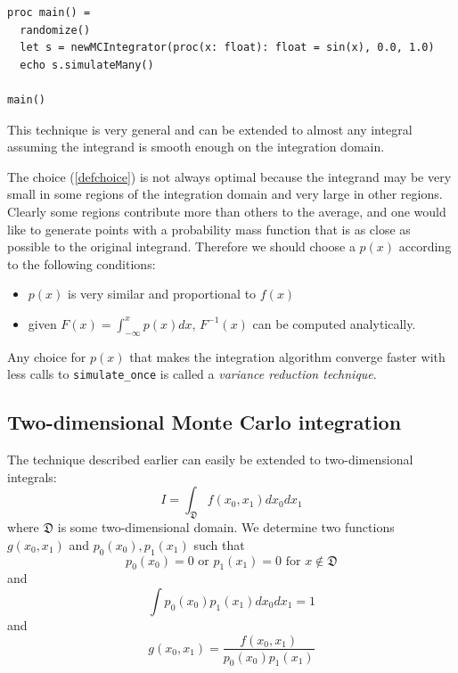 \documentclass[justified, sixbynine]{tufte-book}
\def\ft{\small\tt}
\theoremstyle{plain}%
\newtheorem * {corollary}{Corollary}
\theoremstyle{definition}
\theoremstyle{remark}
\newtheorem * {remark}{Remark}
\newtheorem * {note}{Note}
\begin{document}
\begin{fullwidth}
\begin{lstlisting}[caption={in file: {\ft integrate.nim}}]
proc main() =
  randomize()
  let s = newMCIntegrator(proc(x: float): float = sin(x), 0.0, 1.0)
  echo s.simulateMany()

main()
\end{lstlisting}

This technique is very general and can be extended to almost any integral
assuming the integrand is smooth enough on the integration domain.

The choice (\ref{defchoice}) is not always optimal because the integrand may
be very small in some regions of the integration domain and very large in
other regions. Clearly some regions contribute more than others to the
average, and one would like to generate points with a probability mass
function that is as close as possible to the original integrand. Therefore
we should choose a $p(x)$ according to the following conditions:

\begin{itemize}
\item  $p(x)$ is very similar and proportional to $f(x)$

\item  given $F(x)=\int_{-\infty }^xp(x)dx$, $F^{-1}(x)$ can be computed
analytically.
\end{itemize}

Any choice for $p(x)$ that makes the integration algorithm converge faster with less calls to {\ft simulate\_once} is called a {\it variance reduction technique}.

\goodbreak\subsection{Two-dimensional Monte Carlo integration}

The technique described earlier can easily be extended to two-dimensional integrals:
\begin{equation}
I=\int_{{\mathfrak D}}f(x_0, x_1)dx_0dx_1
\end{equation}
where ${\mathfrak D}$ is some two-dimensional domain. We determine two functions
$g(x_0, x_1)$ and $p_0(x_0), p_1(x_1)$ such that
\begin{equation}
p_0(x_0)=0\text{ or }p_1(x_1)=0\text{ for }x\notin {\mathfrak D}
\end{equation}
and
\begin{equation}
\int p_0(x_0)p_1(x_1)dx_0dx_1=1
\end{equation}
and
\begin{equation}
g(x_0, x_1)=\frac{f(x_0, x_1)}{p_0(x_0)p_1(x_1)}
\end{equation}


\end{fullwidth}
\end{document}
